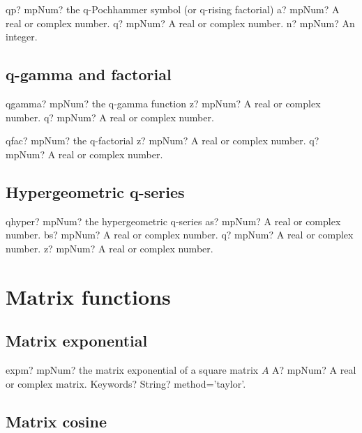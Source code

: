 \documentclass[12pt,a4paper,openany]{book}
\begin{document}
\begin{mpFunctionsExtract}
\mpFunctionThree
{qp? mpNum? the q-Pochhammer symbol (or q-rising factorial)}
{a? mpNum? A real or complex number.}
{q? mpNum? A real or complex number.}
{n? mpNum? An integer.}
\end{mpFunctionsExtract}

\section{q-gamma and factorial}

\begin{mpFunctionsExtract}
\mpFunctionTwo
{qgamma? mpNum? the q-gamma function}
{z? mpNum? A real or complex number.}
{q? mpNum? A real or complex number.}
\end{mpFunctionsExtract}

\begin{mpFunctionsExtract}
\mpFunctionTwo
{qfac? mpNum? the  q-factorial}
{z? mpNum? A real or complex number.}
{q? mpNum? A real or complex number.}
\end{mpFunctionsExtract}

\section{Hypergeometric q-series}

\begin{mpFunctionsExtract}
\mpFunctionFour
{qhyper? mpNum? the hypergeometric q-series}
{as? mpNum? A real or complex number.}
{bs? mpNum? A real or complex number.}
{q? mpNum? A real or complex number.}
{z? mpNum? A real or complex number.}
\end{mpFunctionsExtract}

\chapter{Matrix functions}

\section{Matrix exponential}

\begin{mpFunctionsExtract}
\mpFunctionTwo
{expm? mpNum? the matrix exponential of a square matrix $A$}
{A? mpNum? A real or complex matrix.}
{Keywords? String? method='taylor'.}
\end{mpFunctionsExtract}

\section{Matrix cosine}
\end{document}
